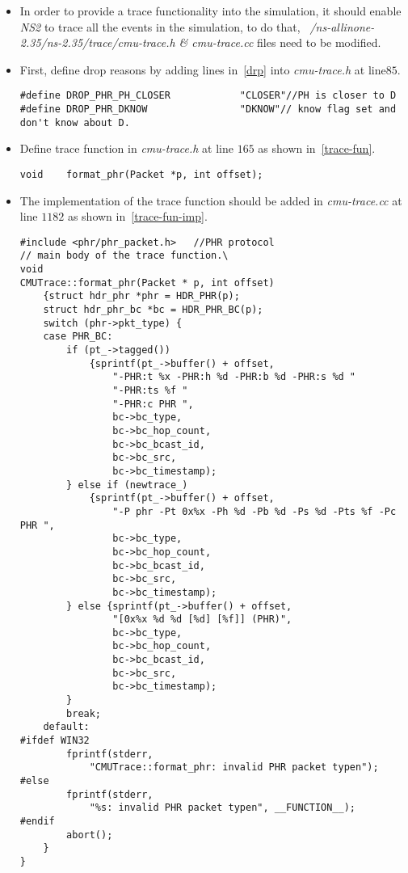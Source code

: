 \documentclass{article}
\begin{document}
\begin{itemize}
\item In order to provide a trace functionality into the simulation, it should enable \emph{NS2} to trace
all the events in the simulation, to do that, \emph{~/ns-allinone-2.35/ns-2.35/trace/cmu-trace.h \& cmu-trace.cc}
 files need to be modified.
\item First, define drop reasons by adding lines in~\ref{drp} into \emph{cmu-trace.h} at line$85$. 
\begin{lstlisting}[caption= Define drop reasons \label{drp} ,float]
#define DROP_PHR_PH_CLOSER            "CLOSER"//PH is closer to D
#define DROP_PHR_DKNOW                "DKNOW"// know flag set and don't know about D.
\end{lstlisting}

\item Define trace function in \emph{cmu-trace.h} at line $165$ as shown in~\ref{trace-fun}. 
\begin{lstlisting}[caption= Define trace function \label{trace-fun} ]
void    format_phr(Packet *p, int offset);
\end{lstlisting}

\item The implementation of the trace function should be added in \emph{cmu-trace.cc} at line $1182$ as shown in~\ref{trace-fun-imp}.
\begin{lstlisting}[caption= Main body of PHR trace function. \label{trace-fun-imp} ]
#include <phr/phr_packet.h>   //PHR protocol
// main body of the trace function.\
void
CMUTrace::format_phr(Packet * p, int offset)
	{struct hdr_phr *phr = HDR_PHR(p);
	struct hdr_phr_bc *bc = HDR_PHR_BC(p);
	switch (phr->pkt_type) {
	case PHR_BC:
		if (pt_->tagged())
			{sprintf(pt_->buffer() + offset,
				"-PHR:t %x -PHR:h %d -PHR:b %d -PHR:s %d "
				"-PHR:ts %f "
				"-PHR:c PHR ",
				bc->bc_type,
				bc->bc_hop_count,
				bc->bc_bcast_id,
				bc->bc_src,
				bc->bc_timestamp);
		} else if (newtrace_)
		 	{sprintf(pt_->buffer() + offset,
				"-P phr -Pt 0x%x -Ph %d -Pb %d -Ps %d -Pts %f -Pc PHR ",
				bc->bc_type,
				bc->bc_hop_count,
				bc->bc_bcast_id,
				bc->bc_src,
				bc->bc_timestamp);
		} else {sprintf(pt_->buffer() + offset,
				"[0x%x %d %d [%d] [%f]] (PHR)",
				bc->bc_type,
				bc->bc_hop_count,
				bc->bc_bcast_id,
				bc->bc_src,
				bc->bc_timestamp);
		}
		break;
	default:
#ifdef WIN32
		fprintf(stderr,
			"CMUTrace::format_phr: invalid PHR packet typen");
#else
		fprintf(stderr,
			"%s: invalid PHR packet typen", __FUNCTION__);
#endif
		abort();
	}
}
\end{lstlisting}


\end{itemize}
\end{document}
